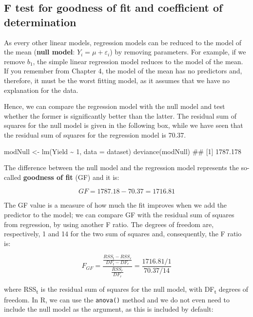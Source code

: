 \documentclass[a4paper,12pt,oneside]{book}
\newenvironment{Shaded}{\begin{snugshade}}{\end{snugshade}}
\newcommand{\DecValTok}[1]{#1}
\newcommand{\SpecialCharTok}[1]{#1}
\newcommand{\DocumentationTok}[1]{#1}
\newcommand{\OtherTok}[1]{#1}
\newcommand{\FunctionTok}[1]{#1}
\newcommand{\AttributeTok}[1]{#1}
\newcommand{\NormalTok}[1]{#1}
\begin{document}
\hypertarget{f-test-for-goodness-of-fit-and-coefficient-of-determination}{%
\subsection{F test for goodness of fit and coefficient of determination}\label{f-test-for-goodness-of-fit-and-coefficient-of-determination}}

As every other linear models, regression models can be reduced to the model of the mean (\textbf{null model}: \(Y_i = \mu + \varepsilon_i\)) by removing parameters. For example, if we remove \(b_1\), the simple linear regression model reduces to the model of the mean. If you remember from Chapter 4, the model of the mean has no predictors and, therefore, it must be the worst fitting model, as it assumes that we have no explanation for the data.

Hence, we can compare the regression model with the null model and test whether the former is significantly better than the latter. The residual sum of squares for the null model is given in the following box, while we have seen that the residual sum of squares for the regression model is 70.37.

\begin{Shaded}
\begin{Highlighting}[]
\NormalTok{modNull }\OtherTok{\textless{}{-}} \FunctionTok{lm}\NormalTok{(Yield }\SpecialCharTok{\textasciitilde{}} \DecValTok{1}\NormalTok{, }\AttributeTok{data =}\NormalTok{ dataset)}
\FunctionTok{deviance}\NormalTok{(modNull)}
\DocumentationTok{\#\# [1] 1787.178}
\end{Highlighting}
\end{Shaded}

The difference between the null model and the regression model represents the so-called \textbf{goodness of fit} (GF) and it is:

\[GF = 1787.18 - 70.37 = 1716.81\]

The GF value is a measure of how much the fit improves when we add the predictor to the model; we can compare GF with the residual sum of squares from regression, by using another F ratio. The degrees of freedom are, respectively, 1 and 14 for the two sum of squares and, consequently, the F ratio is:

\[ F_{GF} = \frac{\frac{RSS_t - RSS_r}{DF_t - DF_r} } {\frac{RSS_r}{DF_r}} = \frac{1716.81/1}{70.37/14}\]

where RSS\textsubscript{t} is the residual sum of squares for the null model, with DF\textsubscript{t} degrees of freedom. In R, we can use the \texttt{anova()} method and we do not even need to include the null model as the argument, as this is included by default:
\end{document}
